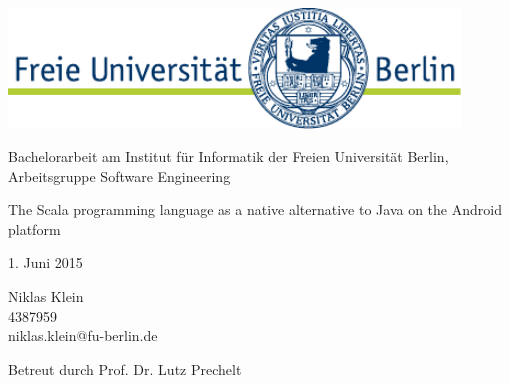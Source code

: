 \begin{titlepage}

	\begin{center}

		\includegraphics[width=12cm]{asset/fu-logo.pdf}

		\vspace{1.5cm}

		Bachelorarbeit am Institut für Informatik der Freien Universität Berlin, Arbeitsgruppe Software Engineering

		\vspace{2.5cm}

		\begin{spacing}{1.3}
        	\huge The Scala programming language as a native alternative to Java on the Android platform
        \end{spacing}

		\vspace{2cm}

		1. Juni 2015

		\vspace{\fill}

		Niklas Klein\\
		4387959\\
		niklas.klein@fu-berlin.de

		\vspace{0.7cm}

		Betreut durch Prof. Dr. Lutz Prechelt

	\end{center}

\end{titlepage}